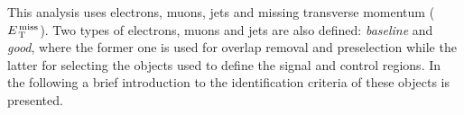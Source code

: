 This analysis uses electrons, muons, jets and missing transverse momentum
($E_\mathrm{\, T}^\mathrm{\, miss}$). Two types of electrons, muons and jets are also defined: \emph{baseline}
and \emph{good}, where the former one is used for overlap removal and
preselection while the latter for selecting the objects used to define the
signal and control regions. In the following a brief introduction to the
identification criteria of these objects is presented.
